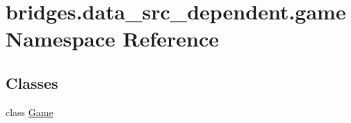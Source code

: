 \hypertarget{namespacebridges_1_1data__src__dependent_1_1game}{}\section{bridges.\+data\+\_\+src\+\_\+dependent.\+game Namespace Reference}
\label{namespacebridges_1_1data__src__dependent_1_1game}
\subsection*{Classes}
\begin{DoxyCompactItemize}
\item 
class \hyperlink{classbridges_1_1data__src__dependent_1_1game_1_1_game}{Game}
\end{DoxyCompactItemize}
